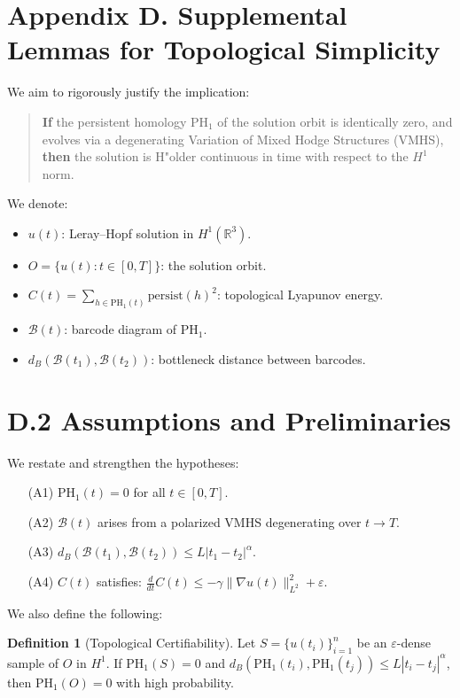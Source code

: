 \documentclass[11pt]{article}
\theoremstyle{definition}
\newtheorem{definition}[theorem]{Definition}
\begin{document}

\section{Appendix D. Supplemental Lemmas for Topological Simplicity}
\label{sec:appendixD}

We aim to rigorously justify the implication:
\begin{quote}
\textbf{If} the persistent homology PH$_1$ of the solution orbit is identically zero, and evolves via a degenerating Variation of Mixed Hodge Structures (VMHS), \textbf{then} the solution is H"older continuous in time with respect to the $H^1$ norm.
\end{quote}
We denote:
\begin{itemize}
  \item $u(t)$: Leray--Hopf solution in $H^1(\mathbb{R}^3)$.
  \item $O = \{u(t): t \in [0,T]\}$: the solution orbit.
  \item $C(t) = \sum_{h \in \mathrm{PH}_1(t)} \mathrm{persist}(h)^2$: topological Lyapunov energy.
  \item $\mathcal{B}(t)$: barcode diagram of $\mathrm{PH}_1$.
  \item $d_B(\mathcal{B}(t_1),\mathcal{B}(t_2))$: bottleneck distance between barcodes.
\end{itemize}

\section*{D.2 Assumptions and Preliminaries}
We restate and strengthen the hypotheses:
\begin{enumerate}
  \item[(A1)] $\mathrm{PH}_1(t) = 0$ for all $t \in [0,T]$.
  \item[(A2)] $\mathcal{B}(t)$ arises from a polarized VMHS degenerating over $t \to T$.
  \item[(A3)] $d_B(\mathcal{B}(t_1), \mathcal{B}(t_2)) \leq L |t_1 - t_2|^\alpha$.
  \item[(A4)] $C(t)$ satisfies: $\frac{d}{dt} C(t) \leq -\gamma \|\nabla u(t)\|_{L^2}^2 + \varepsilon$.
\end{enumerate}

We also define the following:
\begin{definition}[Topological Certifiability]
Let $S = \{u(t_i)\}_{i=1}^n$ be an $\varepsilon$-dense sample of $O$ in $H^1$. If $\mathrm{PH}_1(S) = 0$ and $d_B(\mathrm{PH}_1(t_i), \mathrm{PH}_1(t_j)) \leq L |t_i - t_j|^\alpha$, then $\mathrm{PH}_1(O) = 0$ with high probability.
\end{definition}
\end{document}
